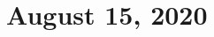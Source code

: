\documentclass[10pt,letterpaper]{article}
\begin{document}
\section*{August 15, 2020}
\begin{multicols*}{3}
\newgame
\begin{figure}[H]
\\
\scalebox{.8}{\showboard}
\end{figure}
\begin{figure}[H]
\\
\scalebox{.8}{\showboard}
\end{figure}
\begin{figure}[H]
\\
\scalebox{.8}{\showboard}
\end{figure}
\begin{figure}[H]
\\
\scalebox{.8}{\showboard}
\end{figure}
\begin{figure}[H]
\\
\scalebox{.8}{\showboard}
\end{figure}
\begin{figure}[H]
\\
\scalebox{.8}{\showboard}
\end{figure}
\begin{figure}[H]
\\
\scalebox{.8}{\showboard}
\end{figure}
\end{multicols*}
\end{document}
